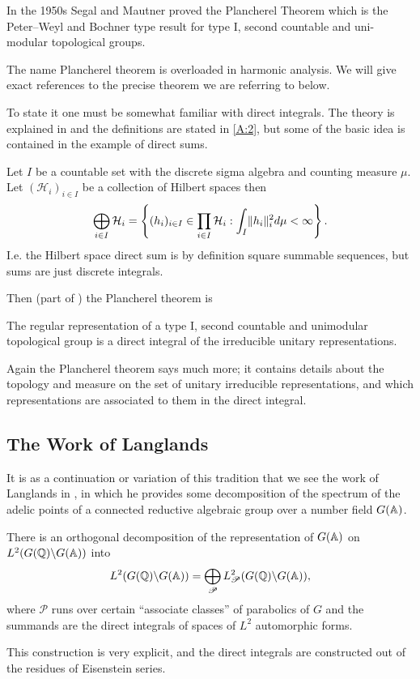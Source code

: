 In the 1950s Segal and Mautner proved the Plancherel Theorem which is the Peter--Weyl and Bochner type result for type I, second countable and uni-modular topological groups.
\begin{remark}
	The name Plancherel theorem is overloaded in harmonic analysis. We will give exact references to the precise theorem we are referring to below.
\end{remark}
 To state it one must be somewhat familiar with direct integrals. The theory is explained in \cite[7.4]{follandCourseAbstractHarmonic2016a} and the definitions are stated in \ref{A:2}, but some of the basic idea is contained in the example of direct sums.
\begin{example}
	Let \(I\) be a countable set with the discrete sigma algebra and counting measure \(\mu\). Let \((\mathcal{H}_i)_{i\in I}\) be a collection of Hilbert spaces then
	\[\bigoplus_{i\in I} \mathcal{H}_i = \left\{ (h_i)_{i\in I}\in \prod_{i\in I} \mathcal{H}_i : \int_I \lVert h_i \rVert_i^2 d\mu <\infty \right\}.\]
	I.e. the Hilbert space direct sum is by definition square summable sequences, but sums are just discrete integrals.
\end{example}
Then (part of ) the Plancherel theorem is
\begin{Theorem}
	The regular representation of a type I, second countable and unimodular topological group is a direct integral of the irreducible unitary representations. 
\end{Theorem}
\begin{remark}
	Again the Plancherel theorem says much more; it contains details about the topology and measure on the set of unitary irreducible representations, and which representations are associated to them in the direct integral.
\end{remark}

\subsection{The Work of Langlands}
It is as a continuation or variation of this tradition that we see the work of Langlands in \cite{langlandsFunctionalEquationsSatisfied1976}, in which he provides some decomposition of the spectrum of the adelic points of a connected reductive algebraic group over a number field \(G(\A)\).

\begin{Theorem}
	There is an orthogonal decomposition of the representation of \(G(\A)\) on \(L^2(G(\Q) \backslash G(\A))\) into 
	\[L^2(G(\Q) \backslash G(\A)) = \bigoplus_{\mathscr{P}}L^2_\mathscr{P}(G(\Q) \backslash G(\A)),\]
	where \(\mathscr{P}\) runs over certain ``associate classes'' of parabolics of \(G\) and the summands are the direct integrals of spaces of \(L^2\) automorphic forms.
\end{Theorem}
This construction is very explicit, and the direct integrals are constructed out of the residues of Eisenstein series.

